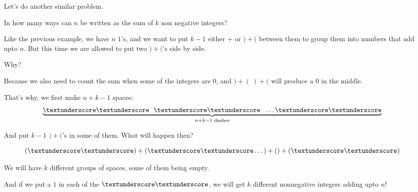 \documentclass[compress]{beamer}
\begin{document}
\begin{frame}
    Let's do another similar problem. \vspace{1em}

    \textcolor{NordOrange}{
        In how many ways can $n$ be written as the sum of $k$ non negative
        integers?
    }

    \pause\vspace{1em}

    Like the previous example, \textcolor{NordBlue}{we have $n $ $1$'s, and we
    want to put $k-1$ either $+$ or $)+($ between them} to group them into
    numbers that add upto $n$.  But this time \textcolor{NordRed}{we are
    allowed to put two $)+($'s side by side.}

    \pause\vspace{1em}

    Why?

    \pause\vspace{1em}

    \textcolor{NordBlue}{Because we also need to count the sum when some of
    the integers are $0$, and $)+(\ )+($ will produce a $0$ in the middle.}
\end{frame}

\begin{frame}
    That's why, we first make $n+k-1$ spaces:
    \textcolor{NordRed}{
        \[\underbrace{\textunderscore\textunderscore \ \
                \textunderscore\textunderscore \ \ \dots
        \textunderscore\textunderscore}_{n+k-1 \text{ dashes}} \] 
    }

    \pause\vspace{1em}
    
    And put $k-1$ $)+($'s in some of them. What will happen then?

    \pause\vspace{1em}

    \textcolor{NordRed}{
        \[\left(\textunderscore\textunderscore )+( \textunderscore\textunderscore
        \dots)+\left(\right) + ( \textunderscore\textunderscore\right) \] 
    }

    \pause\vspace{1em}
    
    \textcolor{NordBlue}{We will have $k$ different groups of spaces, some of
    them being empty.} 

    \pause\vspace{1em}

    And if we put a $1$ in each of the $\textunderscore\textunderscore$, we will
    get $k$ different nonnegative integers adding upto $n$!
\end{frame}
\end{document}

